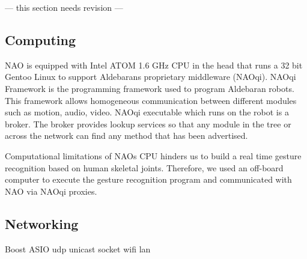 

--- this section needs revision ---

\subsection{Computing} NAO is equipped with Intel ATOM 1.6 GHz CPU in the head that runs a 32 bit Gentoo Linux to support Aldebarans proprietary middleware (NAOqi). NAOqi Framework is the programming framework used to program Aldebaran robots. This framework allows homogeneous communication between different modules such as motion, audio, video. NAOqi executable which runs on the robot is a broker. The broker provides lookup services so that any module in the tree or across the network can find any method that has been advertised.



Computational limitations of NAOs CPU hinders us to build a real time gesture recognition based on human skeletal joints. Therefore, we used an off-board computer to execute the gesture recognition program and communicated with NAO via NAOqi proxies. 

\subsection{Networking} Boost ASIO udp unicast socket wifi lan 
